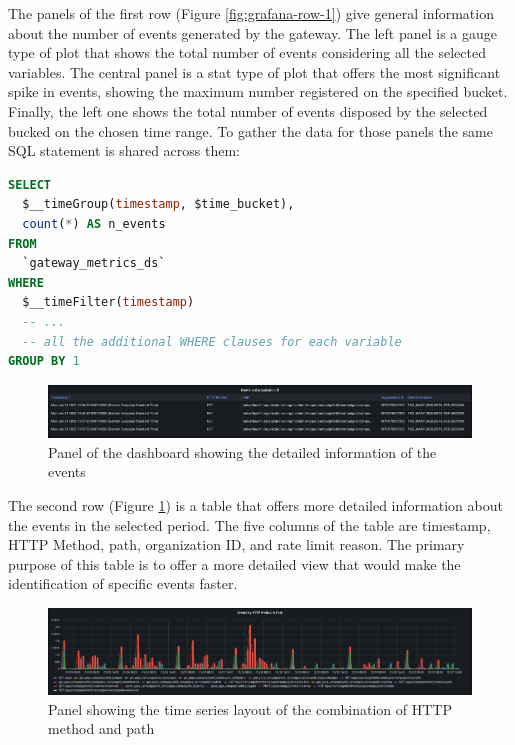\documentclass[english, 12pt, a4paper, sci, utf8, a-1b, online]{aaltothesis}
\begin{document}
The panels of the first row (Figure \ref{fig:grafana-row-1}) give general information about the number of events generated by the gateway. The left panel is a gauge type of plot that shows the total number of events considering all the selected variables. The central panel is a stat type of plot that offers the most significant spike in events, showing the maximum number registered on the specified bucket. Finally, the left one shows the total number of events disposed by the selected bucked on the chosen time range. To gather the data for those panels the same SQL statement is shared across them:\\

\begin{lstlisting}[language=sql,firstnumber=1]
SELECT 
  $__timeGroup(timestamp, $time_bucket),
  count(*) AS n_events
FROM 
  `gateway_metrics_ds`
WHERE 
  $__timeFilter(timestamp)
  -- ...
  -- all the additional WHERE clauses for each variable
GROUP BY 1
\end{lstlisting}

\begin{figure}[h]
    \centering
    \includegraphics[scale=0.24]{src/thesis/img/technical-solution/grafana-dashboard/row-2.png}
    \caption{Panel of the dashboard showing the detailed information of the events}
    \label{fig:grafana-row-2}
\end{figure}

The second row (Figure \ref{fig:grafana-row-2}) is a table that offers more detailed information about the events in the selected period. The five columns of the table are timestamp, HTTP Method, path, organization ID, and rate limit reason. The primary purpose of this table is to offer a more detailed view that would make the identification of specific events faster.

\begin{figure}[h]
    \centering
    \includegraphics[scale=0.24]{src/thesis/img/technical-solution/grafana-dashboard/row-3.png}
    \caption{Panel showing the time series layout of the combination of HTTP method and path}
    \label{fig:grafana-row-3}
\end{figure}
\end{document}
